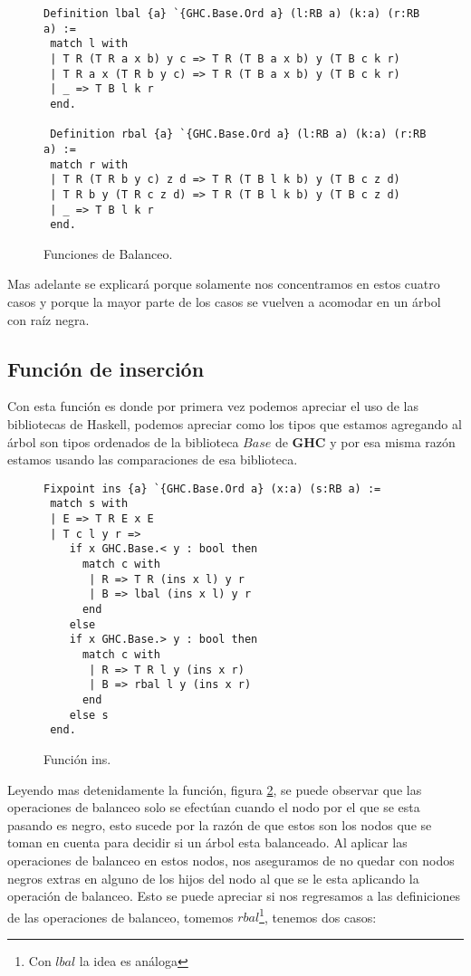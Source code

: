 \begin{figure}
\centering
\captionsetup{justification=centering}
\begin{verbatim}
Definition lbal {a} `{GHC.Base.Ord a} (l:RB a) (k:a) (r:RB a) :=
 match l with
 | T R (T R a x b) y c => T R (T B a x b) y (T B c k r)
 | T R a x (T R b y c) => T R (T B a x b) y (T B c k r)
 | _ => T B l k r
 end.

 Definition rbal {a} `{GHC.Base.Ord a} (l:RB a) (k:a) (r:RB a) :=
 match r with
 | T R (T R b y c) z d => T R (T B l k b) y (T B c z d)
 | T R b y (T R c z d) => T R (T B l k b) y (T B c z d)
 | _ => T B l k r
 end.
\end{verbatim}
\caption{Funciones de Balanceo.}
\label{func_balanceo}
\end{figure}

Mas adelante se explicar\'a porque solamente nos concentramos en estos cuatro casos y porque la
mayor parte de los casos se vuelven a acomodar en un \'arbol con ra\'iz negra.

\subsection {Funci\'on de inserci\'on}
Con esta funci\'on es donde por primera vez podemos apreciar el uso de las  bibliotecas de
Haskell, podemos apreciar como los tipos que estamos agregando al \'arbol son tipos ordenados de
la biblioteca $Base$ de \textbf{GHC} y por esa misma raz\'on estamos usando las comparaciones de
esa biblioteca.
\begin{figure}
\centering
\captionsetup{justification=centering}
\begin{verbatim}
Fixpoint ins {a} `{GHC.Base.Ord a} (x:a) (s:RB a) :=
 match s with
 | E => T R E x E
 | T c l y r =>
    if x GHC.Base.< y : bool then
      match c with
       | R => T R (ins x l) y r
       | B => lbal (ins x l) y r
      end
    else
    if x GHC.Base.> y : bool then
      match c with
       | R => T R l y (ins x r)
       | B => rbal l y (ins x r)
      end
    else s
 end.
\end{verbatim}
\caption{Funci\'on ins.}
\label{func_ins}
\end{figure}

Leyendo mas detenidamente la funci\'on, figura \ref{func_ins}, se puede observar que las
operaciones de balanceo solo se efectúan cuando el nodo por el que se esta pasando es negro, esto
sucede por la raz\'on de que estos son los nodos  que se toman en cuenta para decidir si un \'arbol
esta balanceado. Al aplicar las operaciones de balanceo en estos nodos, nos aseguramos de no quedar
con nodos negros extras en alguno de los hijos del nodo al que se le esta aplicando la operación de
balanceo. Esto se puede apreciar si nos regresamos a las definiciones de las operaciones de
balanceo, tomemos $rbal$\footnote{Con $lbal$ la idea es an\'aloga}, tenemos dos casos:

